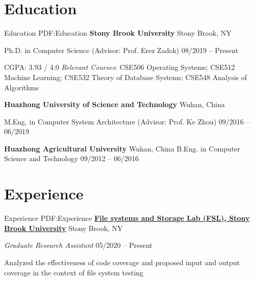 \documentclass[letterpaper,10pt,oneside]{article}
\begin{document}
\begin{body}


\section
{Education}
{Education}
{PDF:Education}
{\textbf{Stony Brook University}}
\hfill
Stony Brook, NY

\BulletItem
Ph.D. in
{Computer Science} (Advisor: Prof. Erez Zadok)
\hfill
08/2019 -- Present
\begin{detail}
\BulletItem
CGPA: 3.93 / 4.0 
\BulletItem
\emph{Relevant Courses}: CSE506 Operating Systems; 
CSE512  Machine Learning; CSE532 Theory of Database Systems; CSE548 Analysis of Algorithms

\end{detail}

\BigGap

{\textbf{Huazhong University of Science and Technology}}
\hfill
Wuhan, China

\GapNoBreak
\BulletItem
M.Eng. in
{Computer System Architecture} (Advisor: Prof. Ke Zhou)
\hfill
09/2016 -- 06/2019
\begin{detail}
\end{detail}

\BigGap
{\textbf{Huazhong Agricultural University}}
\hfill
Wuhan, China
\GapNoBreak
\BulletItem
B.Eng. in
{Computer Science and Technology}
\hfill
09/2012 -- 06/2016
\begin{detail}
\end{detail}

\section
{Experience}
{Experience}
{PDF:Experience}
\href{https://www.fsl.cs.stonybrook.edu/}
{{\textbf{File systems and Storage Lab (FSL), Stony Brook University}}}
\hfill
Stony Brook, NY

\emph{Graduate Research Assistant}
\hfill
05/2020 --
Present

\GapNoBreak
\BulletItem
Analyzed the effectiveness of code coverage and proposed input and output coverage in the context of file system testing


\end{body}
\end{document}
